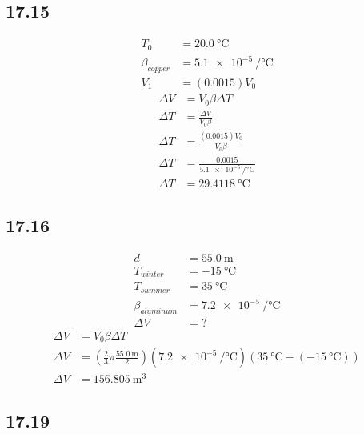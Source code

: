 \documentclass{article}
\begin{document}
\subsection{17.15}

\begin{align*}
	T_0 & = \SI{20.0}{\celsius} \\
	\beta_{copper} & = \SI{5.1e-5}{\per \celsius} \\
	V_1 & = (0.0015)V_0
\end{align*}
\begin{align*}
	\Delta V & = V_0\beta \Delta T \\
	\Delta T & = \frac{ \Delta V }{ V_0\beta } \\
	\Delta T & = \frac{ (0.0015)V_0 }{ V_0\beta } \\
	\Delta T & = \frac{ 0.0015 }{ \SI{5.1e-5}{\per \celsius} } \\
	\Delta T & = \SI{29.4118}{\celsius}
\end{align*}

\subsection{17.16}

\begin{align*}
	d & = \SI{55.0}{\meter} \\
	T_{winter} & = \SI{-15}{\celsius} \\
	T_{summer} & = \SI{35}{\celsius} \\
	\beta_{aluminum} & = \SI{7.2e-5}{\per \celsius} \\
	\Delta V & = ?
\end{align*}
\begin{align*}
	\Delta V & = V_0\beta \Delta T \\
	\Delta V & = \left( \frac{2}{3}\pi \frac{ \SI{55.0}{\meter} }{ 2 } \right) (\SI{7.2e-5}{\per \celsius})(\SI{35}{\celsius} - (\SI{-15}{\celsius})) \\
	\Delta V & = \SI{156.805}{\meter \cubed}
\end{align*}

\subsection{17.19}
\end{document}
